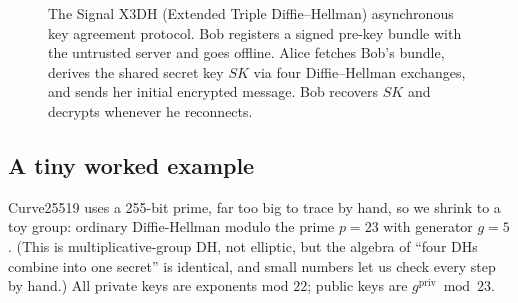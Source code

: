\begin{figure}[H]
\caption{The Signal X3DH (Extended Triple Diffie--Hellman) asynchronous key agreement protocol.
Bob registers a signed pre-key bundle with the untrusted server and goes offline. Alice fetches
Bob's bundle, derives the shared secret key $SK$ via four Diffie--Hellman exchanges, and sends her
initial encrypted message. Bob recovers $SK$ and decrypts whenever he reconnects.}
\label{ch27:fig-x3dh-flow}
\end{figure}

\subsection{A tiny worked example}
\label{ch27:x3dh-toy}

Curve25519 uses a 255-bit prime, far too big to trace by hand, so we shrink to a toy group: ordinary Diffie-Hellman modulo the prime $p = 23$ with generator $g = 5$. (This is multiplicative-group DH, not elliptic, but the algebra of ``four DHs combine into one secret'' is identical, and small numbers let us check every step by hand.) All private keys are exponents mod $22$; public keys are $g^{\text{priv}} \bmod 23$.

